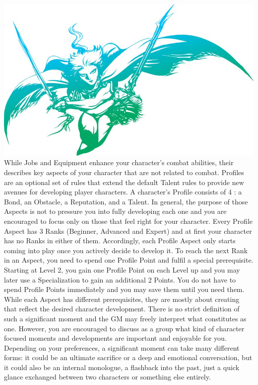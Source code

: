 \documentclass[a4paper, titlepage, 11pt, twocolumn] {article}
\begin{document}
%
\\\\
%
\includegraphics[width=\columnwidth]{./art/images/ff3.jpg}
%
\vfill
%
While Jobs and Equipment enhance your character's combat abilities, their  describes key aspects of your 
character that are not related to combat.
Profiles are an optional set of rules that extend the default Talent rules to provide new avenues for developing player characters.
A character's Profile consists of 4 : a Bond, an Obstacle, a Reputation, and a Talent.
In general, the purpose of those Aspects is not to pressure you into fully developing each one and you are encouraged to focus only on those that feel right for your character.
Every Profile Aspect has 3 Ranks (Beginner, Advanced and Expert) and at first your character has no Ranks in either of them.
Accordingly, each Profile Aspect only starts coming into play once you actively decide to develop it.
To reach the next Rank in an Aspect, you need to spend one Profile Point and fulfil a special prerequisite.
Starting at Level 2, you gain one Profile Point on each Level up and you may later use a Specialization to gain an additional 2 Points.
You do not have to spend Profile Points immediately and you may save them until you need them.
%
\vfill
%
While each Aspect has different prerequisites, they are mostly about creating  that reflect the desired character development.
There is no strict definition of such a significant moment and the GM may freely interpret what constitutes as one.
However, you are encouraged to discuss as a group what kind of character focused moments and developments are important and enjoyable for you.
Depending on your preferences, a significant moment can take many different forms: it could be an ultimate sacrifice or a deep and emotional conversation, but it could also be an internal monologue, a flashback into the past, just a quick glance exchanged between two characters or something else entirely.
\end{document}
